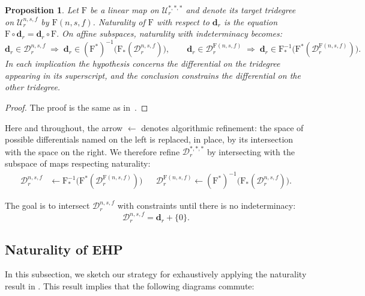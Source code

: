 \documentclass[dvipsnames,table]{amsart}
\newtheorem{proposition}[theorem]{Proposition}
\theoremstyle{definition}
\theoremstyle{remark}
\numberwithin{equation}{section}
\newcommand{\update}{\mathrel{\gets}}
\begin{document}
\begin{proposition}
Let $\mathrm{F}$ be a linear map on $\mathcal{U}_r^{\ast,\ast,\ast}$ and denote
its target tridegree on $\mathcal{U}_r^{n,s,f}$ by $\mathrm{F}(n,s,f)$.
Naturality of $\mathrm{F}$ with respect to $\mathbf{d}_r$ is the equation
$\mathrm{F}\circ\mathbf{d}_r = \mathbf{d}_r\circ\mathrm{F}.$ On affine subspaces, naturality with indeterminacy becomes:
\[
\mathbf{d}_r\!\in\!\mathcal{D}_r^{n,s,f}
\;\Rightarrow\;
\mathbf{d}_r\!\in\!(\mathrm{F}^*)^{-1}\!\big(\mathrm{F}_*(\mathcal{D}_r^{n,s,f})\big),
\qquad
\mathbf{d}_r\!\in\!\mathcal{D}_r^{\mathrm{F}(n,s,f)}
\;\Rightarrow\;
\mathbf{d}_r\!\in\!\mathrm{F}_*^{-1}\!\big(\mathrm{F}^*(\mathcal{D}_r^{\mathrm{F}(n,s,f)})\big).
\]
In each implication the hypothesis concerns the differential on the tridegree appearing in its superscript, and the conclusion constrains the differential on the other tridegree.
\end{proposition}
\begin{proof}
  The proof is the same as in~\cite{Beauvais_Feisthauer_2022}.
\end{proof}
Here and throughout, the arrow $\update$ denotes algorithmic refinement: the space of possible differentials named on the left is replaced, in place, by its intersection with the space on the right. We therefore refine $\mathcal{D}_r^{\ast,\ast,\ast}$ by intersecting with the subspace of maps respecting naturality:
\begin{align}
  \label{eq:nat-const}
  \mathcal{D}_r^{n,s,f}
  &\update
  \mathrm{F}_*^{-1}\!\big(\mathrm{F}^*(\mathcal{D}_r^{\mathrm{F}(n,s,f)})\big)
  &&
  \mathcal{D}_r^{\mathrm{F}(n,s,f)}
  \update
  (\mathrm{F}^*)^{-1}\!\big(\mathrm{F}_*(\mathcal{D}_r^{n,s,f})\big).
\end{align}

The goal is to intersect $\mathcal{D}_r^{n,s,f}$ with constraints until there is no indeterminacy:
\[
\mathcal{D}_r^{n,s,f} = \mathbf{d}_r + \{0\}.
\]
\subsection{Naturality of EHP}
In this subsection, we sketch our strategy for exhaustively applying the naturality result in . This result implies that the following diagrams commute:
\end{document}
